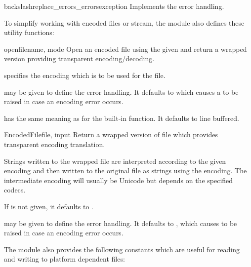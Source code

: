 \begin{funcdesc}{backslashreplace_errors_errors}{exception}
Implements the  error handling.
\end{funcdesc}

To simplify working with encoded files or stream, the module
also defines these utility functions:

\begin{funcdesc}{open}{filename, mode}
Open an encoded file using the given  and return
a wrapped version providing transparent encoding/decoding.


 specifies the encoding which is to be used for the
file.

 may be given to define the error handling. It defaults
to  which causes a  to be raised
in case an encoding error occurs.

 has the same meaning as for the built-in
 function.  It defaults to line buffered.
\end{funcdesc}

\begin{funcdesc}{EncodedFile}{file, input}
Return a wrapped version of file which provides transparent
encoding translation.

Strings written to the wrapped file are interpreted according to the
given  encoding and then written to the original file as
strings using the  encoding. The intermediate encoding will
usually be Unicode but depends on the specified codecs.

If  is not given, it defaults to .

 may be given to define the error handling. It defaults to
, which causes  to be raised in case
an encoding error occurs.
\end{funcdesc}

The module also provides the following constants which are useful
for reading and writing to platform dependent files:

